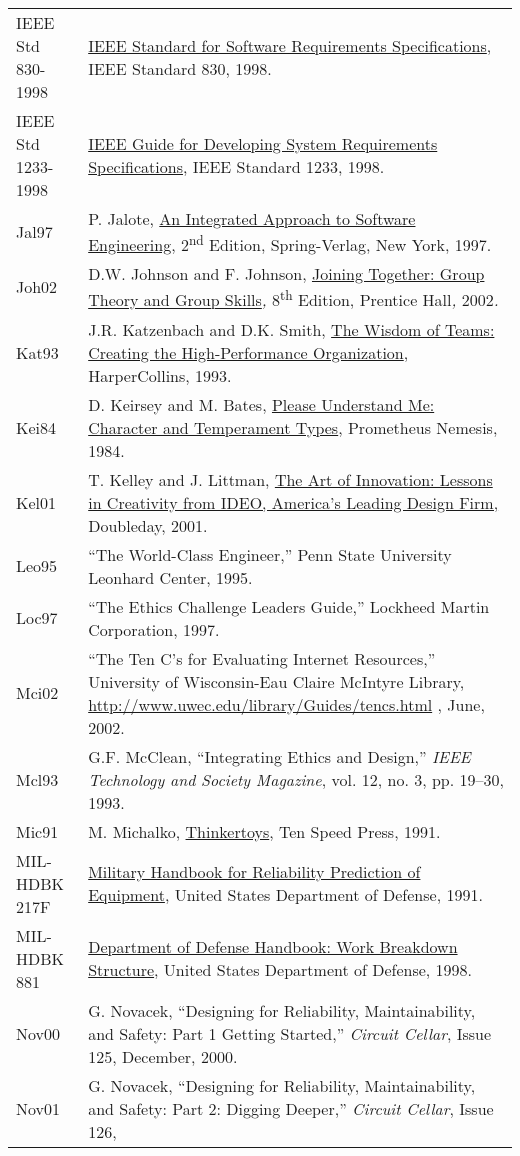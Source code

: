 \begin{longtable}[]{@{}
  >{\raggedright\arraybackslash}p{}
  >{\raggedright\arraybackslash}p{}@{}}
IEEE Std 830-1998 & \ul{IEEE Standard for Software Requirements
Specifications}, IEEE Standard 830, 1998. \\
IEEE Std 1233-1998 & \ul{IEEE Guide for Developing System Requirements
Specifications}, IEEE Standard 1233, 1998. \\
Jal97 & P. Jalote, \ul{An Integrated Approach to Software Engineering},
2\textsuperscript{nd} Edition, Spring-Verlag, New York, 1997. \\
Joh02 & D.W. Johnson and F. Johnson, \ul{Joining Together: Group Theory
and Group Skills}\emph{,} 8\textsuperscript{th} Edition, Prentice
Hall\emph{,} 2002\emph{.} \\
Kat93 & J.R. Katzenbach and D.K. Smith, \ul{The Wisdom of Teams:
Creating the High-Performance Organization}, HarperCollins, 1993. \\
Kei84 & D. Keirsey and M. Bates, \ul{Please Understand Me: Character and
Temperament Types}, Prometheus Nemesis, 1984. \\
Kel01 & T. Kelley and J. Littman, \ul{The Art of Innovation: Lessons in
Creativity from IDEO, America's Leading Design Firm,} Doubleday,
2001. \\
Leo95 & ``The World-Class Engineer,'' Penn State University Leonhard
Center, 1995. \\
Loc97 & ``The Ethics Challenge Leaders Guide,'' Lockheed Martin
Corporation, 1997. \\
Mci02 & ``The Ten C's for Evaluating Internet Resources,'' University of
Wisconsin-Eau Claire McIntyre Library,
\url{http://www.uwec.edu/library/Guides/tencs.html} , June, 2002. \\
Mcl93 & G.F. McClean, ``Integrating Ethics and Design,'' \emph{IEEE
Technology and Society Magazine}, vol. 12, no. 3, pp. 19--30, 1993. \\
Mic91 & M. Michalko, \ul{Thinkertoys}, Ten Speed Press, 1991. \\
MIL-HDBK 217F & \ul{Military Handbook for Reliability Prediction of
Equipment}, United States Department of Defense, 1991. \\
MIL-HDBK 881 & \ul{Department of Defense Handbook: Work Breakdown
Structure}, United States Department of Defense, 1998. \\
Nov00 & G. Novacek, ``Designing for Reliability, Maintainability, and
Safety: Part 1 Getting Started,'' \emph{Circuit Cellar}, Issue 125,
December, 2000. \\
Nov01 & G. Novacek, ``Designing for Reliability, Maintainability, and
Safety: Part 2: Digging Deeper,'' \emph{Circuit Cellar}, Issue 126,

\end{longtable}
